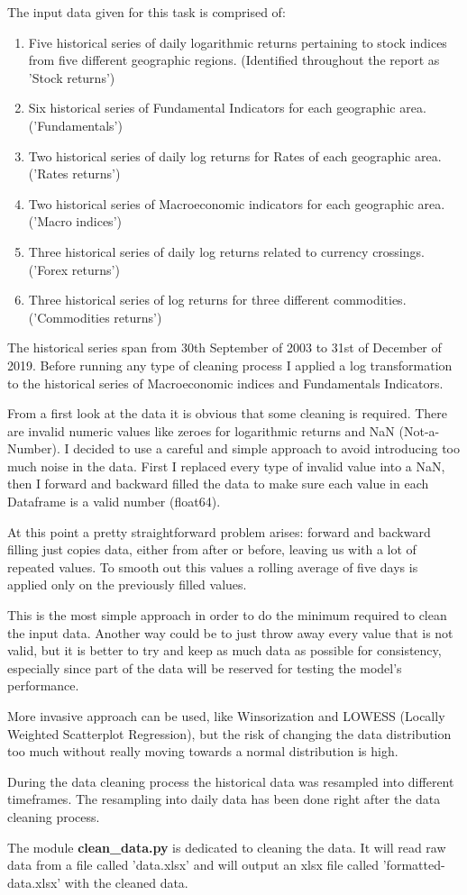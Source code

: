 The input data given for this task is comprised of:
\begin{enumerate}
    \item Five historical series of daily logarithmic returns pertaining to stock indices from five different geographic regions. (Identified throughout the report as 'Stock returns')
    \item Six historical series of Fundamental Indicators for each geographic area. ('Fundamentals')
    \item Two historical series of daily log returns for Rates of each geographic area. ('Rates returns')
    \item Two historical series of Macroeconomic indicators for each geographic area. ('Macro indices')
    \item Three historical series of daily log returns related to currency crossings. ('Forex returns')
    \item Three historical series of log returns for three different commodities. ('Commodities returns')
\end{enumerate}
The historical series span from 30th September of 2003 to 31st of December of 2019. Before running any type of cleaning process I applied a log transformation to the historical series of Macroeconomic indices and Fundamentals Indicators.


From a first look at the data it is obvious that some cleaning is required. There are invalid numeric values like zeroes for logarithmic returns and NaN (Not-a-Number). I decided to use a careful and simple approach to avoid introducing too much noise in the data. First I replaced every type of invalid value into a NaN, then I forward and backward filled the data to make sure each value in each Dataframe is a valid number (float64). 


At this point a pretty straightforward problem arises: forward and backward filling just copies data, either from after or before, leaving us with a lot of repeated values. To smooth out this values a rolling average of five days is applied only on the previously filled values.


This is the most simple approach in order to do the minimum required to clean the input data. Another way could be to just throw away every value that is not valid, but it is better to try and keep as much data as possible for consistency, especially since part of the data will be reserved for testing the model's performance.


More invasive approach can be used, like Winsorization and LOWESS (Locally Weighted Scatterplot Regression), but the risk of changing the data distribution too much without really moving towards a normal distribution is high.

During the data cleaning process the historical data was resampled into different timeframes. The resampling into daily data has been done right after the data cleaning process.

The module \textbf{clean\_data.py} is dedicated to cleaning the data. It will read raw data from a file called 'data.xlsx' and will output an xlsx file called 'formatted-data.xlsx' with the cleaned data.